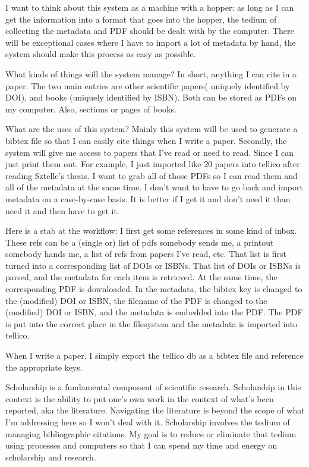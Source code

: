 \documentclass[letterpaper,12pt]{article}
\begin{document}
I want to think about this system as a machine with a hopper: as long as I can get the information into a format that goes into the hopper, the tedium of collecting the metadata and PDF should be dealt with by the computer. There will be exceptional cases where I have to import a lot of metadata by hand, the system should make this process as easy as possible.

What kinds of things will the system manage? In short, anything I can cite in a paper. The two main entries are other scientific papers( uniquely identified by DOI), and books (uniquely identified by ISBN). Both can be stored as PDFs on my computer. Also, sections or pages of books.

What are the uses of this system? Mainly this system will be used to generate a bibtex file so that I can easily cite things when I write a paper. Secondly, the system will give me access to papers that I've read or need to read. Since I can just print them out. For example, I just imported like 20 papers into tellico after reading Sztelle's thesis. I want to grab all of those PDFs so I can read them and all of the metadata at the same time. I don't want to have to go back and import metadata on a case-by-case basis. It is better if I get it and don't need it than need it and then have to get it.

Here is a stab at the workflow: I first get some references in some kind of inbox. These refs can be a (single or) list of pdfs somebody sends me, a printout somebody hands me, a list of refs from papers I've read, etc. That list is first turned into a corresponding list of DOIs or ISBNs. That list of DOIs or ISBNs is parsed, and the metadata for each item is retrieved. At the same time, the corresponding PDF is downloaded. In the metadata, the bibtex key is changed to the (modified) DOI or ISBN, the filename of the PDF is changed to the (modified) DOI or ISBN, and the metadata is embedded into the PDF. The PDF is put into the correct place in the filesystem and the metadata is imported into tellico.

When I write a paper, I simply export the tellico db as a bibtex file and reference the appropriate keys.

Scholarship is a fundamental component of scientific research. Scholarship in this context is the ability to put one's own work in the context of what's been reported, aka the literature. Navigating the literature is beyond the scope of what I'm addressing here so I won't deal with it. Scholarship involves the tedium of managing bibliographic citations. My goal is to reduce or eliminate that tedium using processes and computers so that I can spend my time and energy on scholarship and research.
\end{document}
